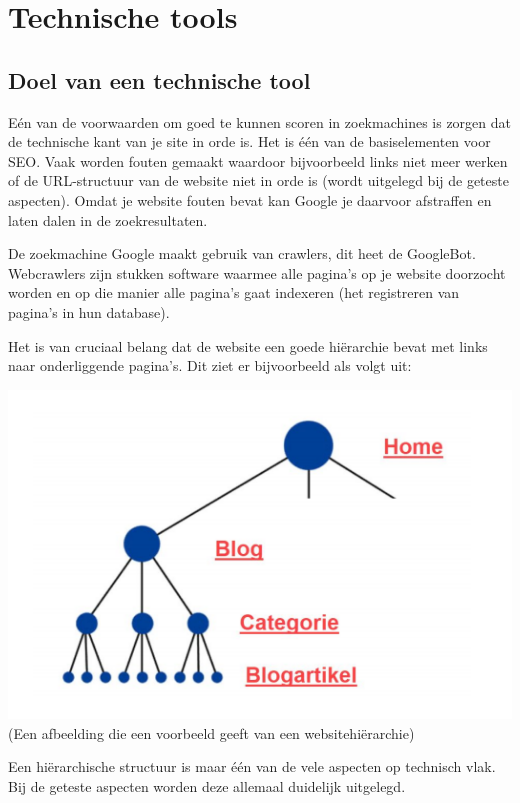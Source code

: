 \section{Technische tools}
\label{ch: Technische tools}

\subsection{Doel van een technische tool}
\label{ch: Doel van een technische tool}

Eén van de voorwaarden om goed te kunnen scoren in zoekmachines is zorgen dat de technische kant van je site in orde is. Het is één van de basiselementen voor SEO. Vaak worden fouten gemaakt waardoor bijvoorbeeld links niet meer werken of de URL-structuur van de website niet in orde is (wordt uitgelegd bij de geteste aspecten). Omdat je website fouten bevat kan Google je daarvoor afstraffen en laten dalen in de zoekresultaten. 

De zoekmachine Google maakt gebruik van crawlers, dit heet de GoogleBot. Webcrawlers zijn stukken software waarmee alle pagina’s op je website doorzocht worden en op die manier alle pagina’s gaat indexeren (het registreren van pagina’s in hun database). 

Het is van cruciaal belang dat de website een goede hiërarchie bevat met links naar onderliggende pagina’s. Dit ziet er bijvoorbeeld als volgt uit: 

\includegraphics[width=\linewidth]{Bachelorproef/bachelor/img/Websitestructuur.png}
(Een afbeelding die een voorbeeld geeft van een websitehiërarchie)

Een hiërarchische structuur is maar één van de vele aspecten op technisch vlak. Bij de geteste aspecten worden deze allemaal duidelijk uitgelegd.

